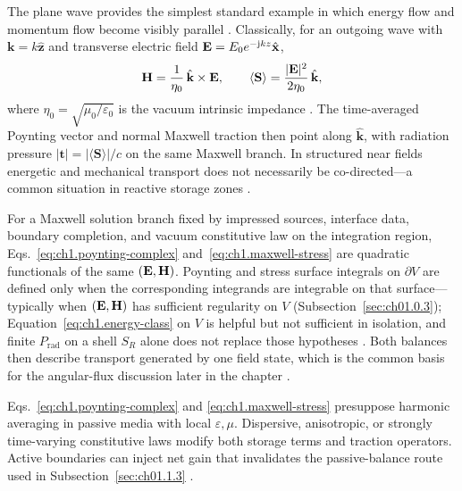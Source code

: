 \label{eq:ch1.energy-momentum-directional-ratio}
The plane wave provides the simplest standard example in which energy flow and momentum flow become visibly parallel \cite{poynting1884,stratton1941}. Classically, for an outgoing wave with $\mathbf{k}=k\hat{\mathbf{z}}$ and transverse electric field $\mathbf{E}=E_0 e^{-\mathrm{j} k z}\hat{\mathbf{x}}$,
\begin{equation}
\label{eq:ch1.plane-wave-transverse}
\mathbf{H}=\frac{1}{\eta_0}\,\hat{\mathbf{k}}\times\mathbf{E},
\qquad
\langle\mathbf{S}\rangle=\frac{|\mathbf{E}|^{2}}{2\eta_0}\,\hat{\mathbf{k}},
\end{equation}
where $\eta_0=\sqrt{\mu_0/\varepsilon_0}$ is the vacuum intrinsic impedance \cite{stratton1941}. The time-averaged Poynting vector and normal Maxwell traction then point along $\hat{\mathbf{k}}$, with radiation pressure $|\mathbf{t}|=|\langle\mathbf{S}\rangle|/c$ on the same Maxwell branch. In structured near fields energetic and mechanical transport does not necessarily be co-directed---a common situation in reactive storage zones \cite{stratton1941}.

\label{prop:ch1.energy-momentum-consistency}
For a Maxwell solution branch fixed by impressed sources, interface data, boundary completion, and vacuum constitutive law on the integration region, Eqs.~\eqref{eq:ch1.poynting-complex} and~\eqref{eq:ch1.maxwell-stress} are quadratic functionals of the same \((\mathbf{E},\mathbf{H})\). Poynting and stress surface integrals on \(\partial V\) are defined only when the corresponding integrands are integrable on that surface---typically when \((\mathbf{E},\mathbf{H})\) has sufficient regularity on \(V\) (Subsection~\ref{sec:ch01.0.3}); Equation~\eqref{eq:ch1.energy-class} on \(V\) is helpful but not sufficient in isolation, and finite \(P_{\mathrm{rad}}\) on a shell \(S_R\) alone does not replace those hypotheses \cite{stratton1941}. Both balances then describe transport generated by one field state, which is the common basis for the angular-flux discussion later in the chapter \cite{stratton1941}.

Eqs.~\eqref{eq:ch1.poynting-complex} and
\eqref{eq:ch1.maxwell-stress} presuppose harmonic averaging in passive media with
local \(\varepsilon,\mu\). Dispersive, anisotropic, or strongly time-varying
constitutive laws modify both storage terms and traction operators. Active boundaries
can inject net gain that invalidates the passive-balance route used in
Subsection~\ref{sec:ch01.1.3}
\cite{stratton1941}.



